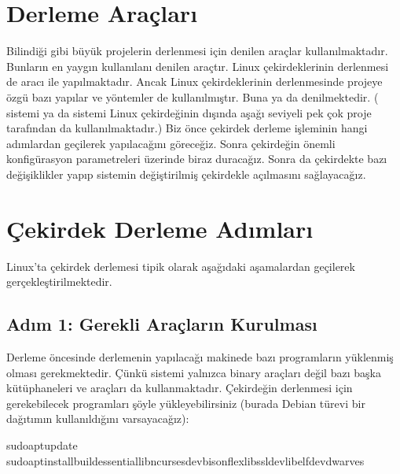 \documentclass[a4paper,10pt,turkish]{sphinxmanual}
\begin{document}
\section{Derleme Araçları}
\label{\detokenize{kernelcompilation:derleme-araclari}}
\sphinxAtStartPar
Bilindiği gibi büyük projelerin derlenmesi için 
denilen araçlar kullanılmaktadır. Bunların en yaygın kullanılanı  denilen araçtır. Linux
çekirdeklerinin derlenmesi de  aracı ile yapılmaktadır. Ancak Linux çekirdeklerinin derlenmesinde
projeye özgü bazı yapılar ve yöntemler de kullanılmıştır. Buna  ya da 
denilmektedir. ( sistemi ya da  sistemi Linux çekirdeğinin dışında aşağı seviyeli pek
çok proje tarafından da kullanılmaktadır.) Biz önce çekirdek derleme işleminin hangi adımlardan
geçilerek yapılacağını göreceğiz. Sonra çekirdeğin önemli konfigürasyon parametreleri üzerinde biraz
duracağız. Sonra da çekirdekte bazı değişiklikler yapıp sistemin değiştirilmiş çekirdekle açılmasını
sağlayacağız.


\section{Çekirdek Derleme Adımları}
\label{\detokenize{kernelcompilation:cekirdek-derleme-adimlari}}
\sphinxAtStartPar
Linux’ta çekirdek derlemesi tipik olarak aşağıdaki aşamalardan geçilerek gerçekleştirilmektedir.


\subsection{Adım 1: Gerekli Araçların Kurulması}
\label{\detokenize{kernelcompilation:adim-1-gerekli-araclarin-kurulmasi}}
\sphinxAtStartPar
Derleme öncesinde derlemenin yapılacağı makinede bazı programların yüklenmiş olması gerekmektedir.
Çünkü  sistemi yalnızca binary araçları değil bazı başka kütüphaneleri ve araçları da
kullanmaktadır. Çekirdeğin derlenmesi için gerekebilecek programları şöyle yükleyebilirsiniz
(burada Debian türevi bir dağıtımın kullanıldığını varsayacağız):

\begin{sphinxVerbatim}[commandchars=\\\{\}]
\PYGZdl{}sudoaptupdate
\PYGZdl{}sudoaptinstallbuild\PYGZhy{}essentiallibncurses\PYGZhy{}devbisonflexlibssl\PYGZhy{}devlibelf\PYGZhy{}devdwarves
\end{sphinxVerbatim}
\end{document}
